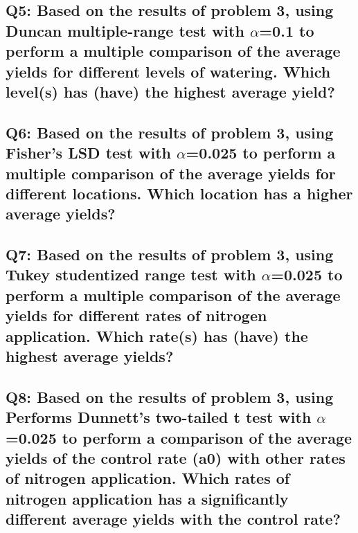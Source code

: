 \documentclass[a4paper,man,natbib]{apa6}
\begin{document}
\subsection*{Q5: Based on the results of problem 3, using Duncan multiple-range test with $\alpha$=0.1 to perform a multiple comparison of the average yields for different levels of watering. Which level(s) has (have) the highest average yield? }
% 

\subsection*{Q6: Based on the results of problem 3, using Fisher’s LSD test with $\alpha$=0.025 to perform a multiple comparison of the average yields for different locations. Which location has a higher average yields? }
% 

\subsection*{Q7: Based on the results of problem 3, using Tukey studentized range test with $\alpha$=0.025 to perform a multiple comparison of the average yields for different rates of nitrogen application. Which rate(s) has (have) the highest average yields? }
% 

\subsection*{Q8: Based on the results of problem 3, using Performs Dunnett’s two-tailed t test with $\alpha$=0.025 to perform a comparison of the average yields of the control rate (a0) with other rates of nitrogen application. Which rates of nitrogen application has a significantly different average yields with the control rate? }
% 
\end{document}
